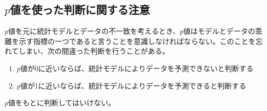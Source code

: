 \subsection{$p$値を使った判断に関する注意}
$p$値を元に統計モデルとデータの不一致を考えるとき、$p$値はモデルとデータの乖離を示す指標の一つであると言うことを意識しなければならない。このことを忘れてしまい、次の間違った判断を行うことがある。
\begin{enumerate}
    \item $p$値が0に近いならば、統計モデルによりデータを予測できないと判断する
    \item $p$値が1に近いならば、統計モデルによりデータを予測できると判断する
\end{enumerate}
$p$値をもとに判断してはいけない。





